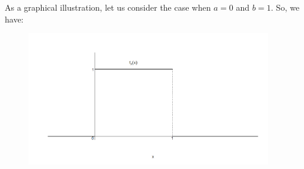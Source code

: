 \documentclass[notes=show,smaller]{beamer}\usepackage[]{graphicx}\usepackage[]{color}
\begin{document}
%
%

\begin{frame}{\subsecname}
  As a graphical illustration, let us consider the case when $a=0$ and $b=1$. So, we have:
  \begin{figure}[ptb]\centering
  \includegraphics[width=0.95\textwidth,height=0.75\textheight]{img/uniform_pdf3.pdf}%
  \end{figure}
\end{frame}
\end{document}

